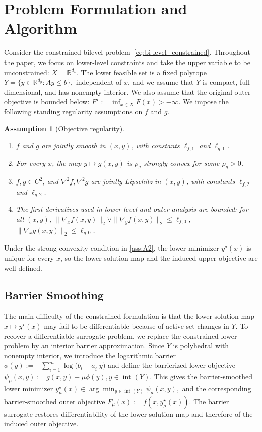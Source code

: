 \documentclass{article}
\newtheorem{assumption}{Assumption}
\begin{document}
\section{Problem Formulation and Algorithm}\label{sec:barrier smoothing}
Consider the constrained bilevel problem~\eqref{eq:bi-level_constrained}. Throughout the paper, we
focus on lower-level constraints and take the upper variable to be unconstrained:
\(X=\mathbb R^{d_x}\). The lower feasible set is a fixed polytope \( Y=\{y\in\mathbb R^{d_y}:Ay\le b\}, \)
independent of \(x\), and we assume that \(Y\) is compact, full-dimensional, and has nonempty
interior. We also assume that the original outer objective is bounded below:
\(F^{\star}:=\inf_{x\in X}F(x)>-\infty . \)
We impose the following standing regularity assumptions on \(f\) and \(g\).


\begin{assumption}[Objective regularity]
\label{ass:euclidean}
\leavevmode
\begin{enumerate}[leftmargin=*, label=\textup{(A\arabic*)}, ref=\textup{(A\arabic*)}]
    \item\label{ass:A1} \(f\) and \(g\) are jointly smooth in \((x,y)\), with constants
    \(\ell_{f,1}\) and \(\ell_{g,1}\).
    \item\label{ass:A2} For every \(x\), the map \(y\mapsto g(x,y)\) is \(\rho_g\)-strongly convex for some \(\rho_g>0\).
    \item\label{ass:A3} \(f,g\in C^2\), and \(\nabla^2 f,\nabla^2 g\) are jointly Lipschitz in
    \((x,y)\), with constants \(\ell_{f,2}\) and \(\ell_{g,2}\).
    \item\label{ass:A4} The first derivatives used in lower-level and outer analysis are bounded: for all
    \((x,y)\),
    \(\|\nabla_x f(x,y)\|_2\vee \|\nabla_y f(x,y)\|_2\le \ell_{f,0}\),
    \(\|\nabla_x g(x,y)\|_2\le \ell_{g,0}\).
\end{enumerate}
\end{assumption}
Under the strong convexity condition in \ref{ass:A2}, the lower minimizer \(y^\star(x)\) is unique
for every \(x\), so the lower solution map and the induced upper objective are well defined.

\subsection{Barrier Smoothing}
The main difficulty of the constrained formulation is that the lower solution map \(x\mapsto y^\star(x)\) may fail to be differentiable because of active-set changes in \(Y\). To recover a differentiable surrogate problem, we replace the constrained lower problem by an interior barrier approximation. Since \(Y\) is polyhedral with nonempty interior, we introduce the logarithmic barrier
\(\phi(y):=-\sum_{i=1}^m \log\bigl(b_i-a_i^\top y\bigr)\)
and define the barrierized lower objective \(\psi_\mu(x,y):=g(x,y)+\mu\phi(y), y\in\operatorname{int}(Y).\)
This gives the barrier-smoothed lower minimizer \(y_\mu^\star(x)\in\arg\min_{y\in\operatorname{int}(Y)}\psi_\mu(x,y),\)
and the corresponding barrier-smoothed outer objective \(F_\mu(x):=f(x,y_\mu^\star(x)).\)
The barrier surrogate restores differentiability of the lower solution map and therefore of the induced outer objective.
\end{document}

